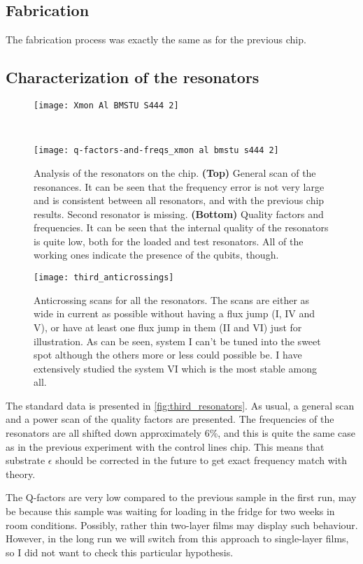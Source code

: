 \documentclass[12pt, twoside]{report}
\numberwithin{equation}{section}
\begin{document}
\subsection{Fabrication}

The fabrication process was exactly the same as for the previous chip.

\subsection{Characterization of the resonators}

\begin{figure}
\texttt{[image: Xmon Al BMSTU S444 2]}

~

\texttt{[image: q-factors-and-freqs\_xmon al bmstu s444 2]}
\caption{Analysis of the resonators on the chip. \textbf{(Top)} General scan of the resonances. It can be seen that the frequency error is not very large and is consistent between all resonators, and with the previous chip results. Second resonator is missing. \textbf{(Bottom)} Quality factors and frequencies. It can be seen that the internal quality of the resonators is quite low, both for the loaded and test resonators. All of the working ones indicate the presence of the qubits, though.}
\label{fig:third_resonators}
\end{figure}

\begin{figure}
\texttt{[image: third\_anticrossings]}
\caption{Anticrossing scans for all the resonators. The scans are either as wide in current as possible without having a flux jump (I, IV and V), or have at least one flux jump in them (II and VI) just for illustration. As can be seen, system I can't be tuned into the sweet spot although the others more or less could possible be. I have extensively studied the system VI which is the most stable among all.}
\label{fig:third_anticrossings}
\end{figure}

The standard data is presented in \autoref{fig:third_resonators}. As usual, a general scan and a power scan of the quality factors are presented. The frequencies of the resonators are all shifted down approximately 6\%, and this is quite the same case as in the previous experiment with the control lines chip. This means that substrate $\epsilon$ should be corrected in the future to get exact frequency match with theory.

The Q-factors are very low compared to the previous sample in the first run, may be because this sample was waiting for loading in the fridge for two weeks in room conditions. Possibly, rather thin two-layer films may display such behaviour. However, in the long run we will switch from this approach to single-layer films, so I did not want to check this particular hypothesis.
\end{document}
